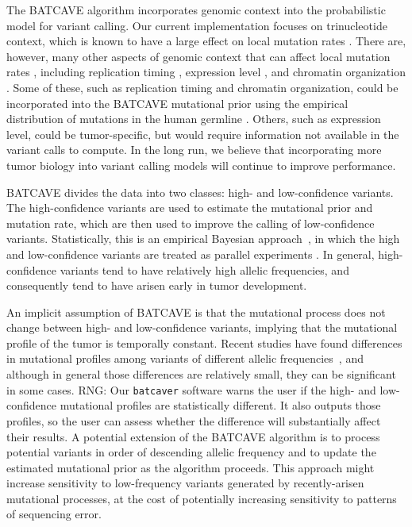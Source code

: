 \documentclass[a4,center,fleqn]{NAR}
\newcommand{\rngcomment}[1]{{\color{red}RNG: #1}}
\newcommand{\batcave}{BATCAVE\xspace}
\begin{document}
The \batcave algorithm incorporates genomic context into the probabilistic model for variant calling.
Our current implementation focuses on trinucleotide context, which is known to have a large effect on local mutation rates \cite{Martincorena2015,Hollstein2017}.
There are, however, many other aspects of genomic context that can affect local mutation rates \cite{Buisson2019}, including replication timing \cite{Stamatoyannopoulos2009}, expression level \cite{Pleasance2010}, and chromatin organization \cite{Schuster-Bockler2012}. 
Some of these, such as replication timing and chromatin organization, could be incorporated into the \batcave mutational prior using the empirical distribution of mutations in the human germline \cite{Hodgkinson2011}.
Others, such as expression level, could be tumor-specific, but would require information not available in the variant calls to compute.
In the long run, we believe that incorporating more tumor biology into variant calling models will continue to improve performance.

\batcave divides the data into two classes: high- and low-confidence variants.
The high-confidence variants are used to estimate the mutational prior and mutation rate, which are then used to improve the calling of low-confidence variants.
Statistically, this is an empirical Bayesian approach~\cite{Robbins1954}, in which the high and low-confidence variants are treated as parallel experiments \cite{Morris1983,Efron2014}. 
In general, high-confidence variants tend to have relatively high allelic frequencies, and consequently tend to have arisen early in tumor development.

An  implicit assumption of \batcave is that the mutational process does not change between high- and low-confidence variants, implying that the mutational profile of the tumor is temporally constant.
Recent studies have found differences in mutational profiles among variants of different allelic frequencies~\cite{Rubanova2018a}, and although in general those differences are relatively small, they can be significant in some cases.
\rngcomment{Our \texttt{batcaver} software warns the user if the high- and low-confidence mutational profiles are statistically different.
It also outputs those profiles, so the user can assess whether the difference will substantially affect their results.} 
A potential extension of the \batcave algorithm is to process potential variants in order of descending allelic frequency and to update the estimated mutational prior as the algorithm proceeds.
This approach might increase sensitivity to low-frequency variants generated by recently-arisen mutational processes, at the cost of potentially increasing sensitivity to patterns of sequencing error.
\end{document}
